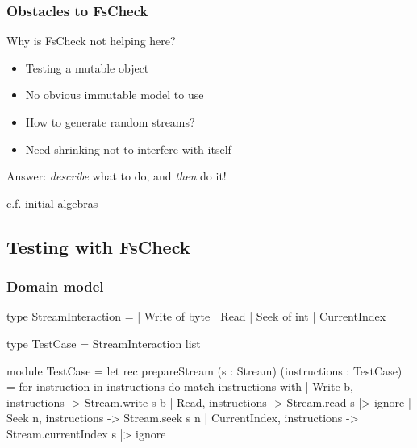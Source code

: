 \documentclass{beamer}
\begin{document}
\begin{frame}
\frametitle{Obstacles to FsCheck}

Why is FsCheck not helping here?

\begin{itemize}
    \item Testing a mutable object
    \item No obvious immutable model to use
    \item How to generate random streams?
    \item Need shrinking not to interfere with itself
\end{itemize}
\end{frame}

\begin{frame}
Answer: \emph{describe} what to do, and \emph{then} do it!

\pause
\hfill \break

\tiny{c.f. initial algebras}

\end{frame}

\subsection{Testing with FsCheck}

\begin{frame}[fragile]
\frametitle{Domain model}
\begin{fslisting}
type StreamInteraction =
| Write of byte
| Read
| Seek of int
| CurrentIndex

type TestCase = StreamInteraction list
\end{fslisting}

\end{frame}
\begin{frame}[fragile]
\begin{fslisting}
[<RequireQualifiedAccess>]
module TestCase =
    let rec prepareStream
        (s : Stream)
        (instructions : TestCase)
        =
        for instruction in instructions do
            match instructions with
            | Write b, instructions ->
                Stream.write s b
            | Read, instructions ->
                Stream.read s |> ignore
            | Seek n, instructions ->
                Stream.seek s n
            | CurrentIndex, instructions ->
                Stream.currentIndex s |> ignore

\end{fslisting}
\end{frame}
\end{document}
